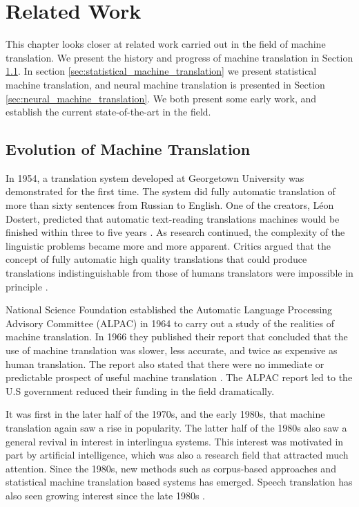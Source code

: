 
\chapter{Related Work}
\label{ch:related_work}
This chapter looks closer at related work carried out in the field of machine translation. We present the history and progress of machine translation in Section \ref{sec:natural_language_processing}. In section \ref{sec:statistical_machine_translation} we present statistical machine translation, and neural machine translation is presented in Section \ref{sec:neural_machine_translation}. We both present some early work, and establish the current state-of-the-art in the field.


\section{Evolution of Machine Translation}
\label{sec:natural_language_processing}
In 1954, a translation system developed at Georgetown University was demonstrated for the first time. The system did fully automatic translation of more than sixty sentences from Russian to English. One of the creators, Léon Dostert, predicted that automatic text-reading translations machines would be finished within three to five years \citep{hutchins1997first}. As research continued, the complexity of the linguistic problems became more and more apparent. Critics argued that the concept of fully automatic high quality translations that could produce translations indistinguishable from those of humans translators were impossible in principle \citep{hutchins2007machine}. 

National Science Foundation established the Automatic Language Processing Advisory Committee (ALPAC) in 1964 to carry out a study of the realities of machine translation. In 1966 they published their report that concluded that the use of machine translation was slower, less accurate, and twice as expensive as human translation. The report also stated that there were no immediate or predictable prospect of useful machine translation \citep{hutchins2007machine, national1966language, koehn2010statistical}. The ALPAC report led to the U.S government reduced their funding in the field dramatically.

It was first in the later half of the 1970s, and the early 1980s, that machine translation again saw a rise in popularity. The latter half of the 1980s also saw a general revival in interest in interlingua systems. This interest was motivated in part by artificial intelligence, which was also a research field that attracted much attention. Since the 1980s, new methods such as corpus-based approaches and statistical machine translation based systems has emerged. Speech translation has also seen growing interest since the late 1980s \citep{hutchins2007machine}.


